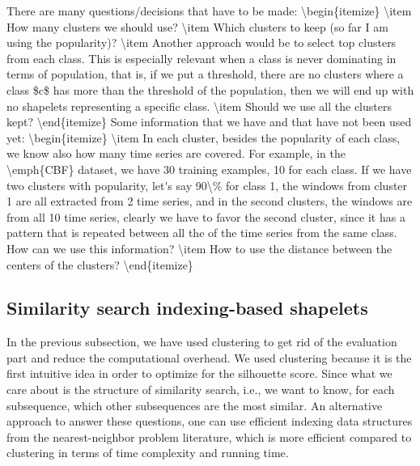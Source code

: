 \documentclass[sigconf, nonacm]{acmart}
\begin{document}
\ac{
	There are many questions/decisions that have to be made:
	\begin{itemize}
		\item How many clusters we should use?
		\item Which clusters to keep (so far I am using the popularity)?
		\item Another approach would be to select top clusters from each class. This
		      is especially relevant when a class is never dominating in terms of
		      population, that is, if we put a threshold, there are no clusters
		      where a class $c$ has more than the threshold of the population, then we
		      will end up with no shapelets representing a specific class.
		\item Should we use all the clusters kept?
	\end{itemize}
	Some information that we have and that have not been used yet:
	\begin{itemize}
		\item In each cluster, besides the popularity of each class, we know also
		      how many time series are covered. For example, in the \emph{CBF}
		      dataset, we have 30 training examples, 10 for each class. If we have
		      two clusters with popularity, let's say 90\% for class 1, the windows
		      from cluster 1 are all extracted from 2 time series, and in the second
		      clusters, the windows are from all 10 time series, clearly we have to
		      favor the second cluster, since it has a pattern that is repeated
		      between all the of the time series from the same class. How can we
		      use this information?
		\item How to use the distance between the centers of the clusters?
	\end{itemize}
}

\subsection{Similarity search indexing-based shapelets}
In the previous subsection, we have used clustering to get rid of the evaluation
part and reduce the computational overhead. We used clustering because it is the
first intuitive idea in order to optimize for the silhouette score.
Since what we care about is the structure of similarity search, i.e., we want to
know, for each subsequence, which other subsequences are the most similar. An
alternative approach to answer these questions, one can use efficient indexing
data structures from the nearest-neighbor problem literature, which is more
efficient compared to clustering in terms of time complexity and running time.
\end{document}
